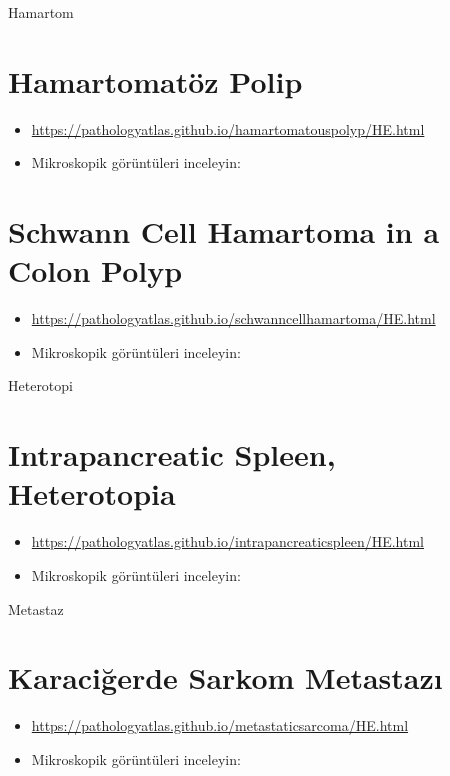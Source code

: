 \documentclass[
  letterpaper,
  DIV=11,
  numbers=noendperiod]{scrreprt}
\begin{document}
Hamartom

\hypertarget{hamartomatuxf6z-polip}{%
\chapter{Hamartomatöz Polip}\label{hamartomatuxf6z-polip}}

\begin{itemize}
\item
  \url{https://pathologyatlas.github.io/hamartomatouspolyp/HE.html}
\item
  Mikroskopik görüntüleri inceleyin:
\end{itemize}

\hypertarget{schwann-cell-hamartoma-in-a-colon-polyp}{%
\chapter{Schwann Cell Hamartoma in a Colon
Polyp}\label{schwann-cell-hamartoma-in-a-colon-polyp}}

\begin{itemize}
\item
  \url{https://pathologyatlas.github.io/schwanncellhamartoma/HE.html}
\item
  Mikroskopik görüntüleri inceleyin:
\end{itemize}

Heterotopi

\hypertarget{intrapancreatic-spleen-heterotopia}{%
\chapter{Intrapancreatic Spleen,
Heterotopia}\label{intrapancreatic-spleen-heterotopia}}

\begin{itemize}
\item
  \url{https://pathologyatlas.github.io/intrapancreaticspleen/HE.html}
\item
  Mikroskopik görüntüleri inceleyin:
\end{itemize}

Metastaz

\hypertarget{karaciux11ferde-sarkom-metastazux131}{%
\chapter{Karaciğerde Sarkom
Metastazı}\label{karaciux11ferde-sarkom-metastazux131}}

\begin{itemize}
\item
  \url{https://pathologyatlas.github.io/metastaticsarcoma/HE.html}
\item
  Mikroskopik görüntüleri inceleyin:
\end{itemize}
\end{document}
